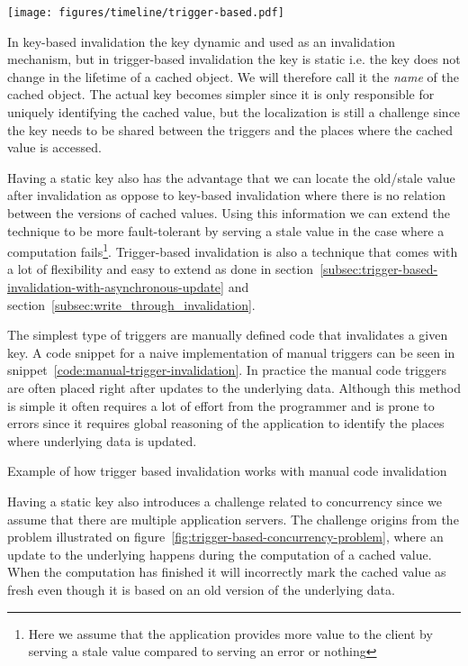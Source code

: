 \begin{figure*}[ht!]
  \centering
  \texttt{[image: figures/timeline/trigger-based.pdf]}
  \caption{The lifecycle of the trigger-based invalidation technique}
  \label{fig:timeline:trigger-based}
\end{figure*}

In key-based invalidation the key dynamic and used as an invalidation mechanism, but in trigger-based invalidation the key is static i.e. the key does not change in the lifetime of a cached object. We will therefore call it the \emph{name} of the cached object. The actual key becomes simpler since it is only responsible for uniquely identifying the cached value, but the localization is still a challenge since the key needs to be shared between the triggers and the places where the cached value is accessed.

Having a static key also has the advantage that we can locate the old/stale value after invalidation as oppose to key-based invalidation where there is no relation between the versions of cached values. Using this information we can extend the technique to be more fault-tolerant by serving a stale value in the case where a computation fails\footnote{Here we assume that the application provides more value to the client by serving a stale value compared to serving an error or nothing}. Trigger-based invalidation is also a technique that comes with a lot of flexibility and easy to extend as done in section~\ref{subsec:trigger-based-invalidation-with-asynchronous-update} and section~\ref{subsec:write_through_invalidation}.

The simplest type of triggers are manually defined code that invalidates a given key. A code snippet for a naive implementation of manual triggers can be seen in snippet~\ref{code:manual-trigger-invalidation}. In practice the manual code triggers are often placed right after updates to the underlying data. Although this method is simple it often requires a lot of effort from the programmer and is prone to errors since it requires global reasoning of the application to identify the places where underlying data is updated.

\begin{code}{Example of how trigger based invalidation works with manual code invalidation}
  
  \label{code:manual-trigger-invalidation}
\end{code}

Having a static key also introduces a challenge related to concurrency since we assume that there are multiple application servers. The challenge origins from the problem illustrated on figure~\ref{fig:trigger-based-concurrency-problem}, where an update to the underlying happens during the computation of a cached value. When the computation has finished it will incorrectly mark the cached value as fresh even though it is based on an old version of the underlying data.


